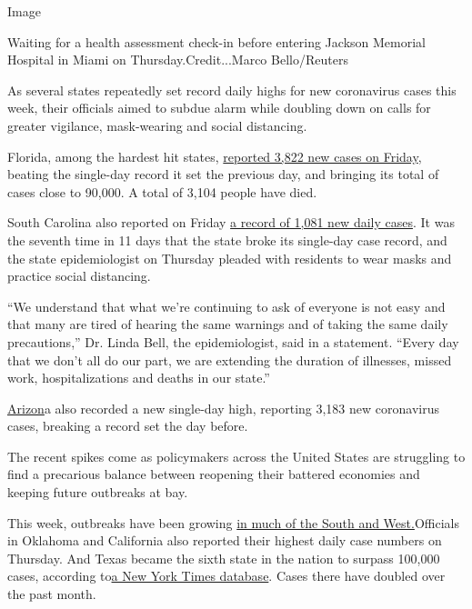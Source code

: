 Image

Waiting for a health assessment check-in before entering Jackson
Memorial Hospital in Miami on Thursday.Credit...Marco Bello/Reuters

As several states repeatedly set record daily highs for new coronavirus
cases this week, their officials aimed to subdue alarm while doubling
down on calls for greater vigilance, mask-wearing and social distancing.

Florida, among the hardest hit states,
\href{https://fdoh.maps.arcgis.com/apps/opsdashboard/index.html\#/8d0de33f260d444c852a615dc7837c86}{reported
3,822 new cases on Friday}, beating the single-day record it set the
previous day, and bringing its total of cases close to 90,000. A total
of 3,104 people have died.

South Carolina also reported on Friday
\href{https://www.scdhec.gov/infectious-diseases/viruses/coronavirus-disease-2019-covid-19/sc-testing-data-projections-covid-19}{a
record of 1,081 new daily cases}. It was the seventh time in 11 days
that the state broke its single-day case record, and the state
epidemiologist on Thursday pleaded with residents to wear masks and
practice social distancing.

``We understand that what we're continuing to ask of everyone is not
easy and that many are tired of hearing the same warnings and of taking
the same daily precautions,'' Dr. Linda Bell, the epidemiologist, said
in a statement. ``Every day that we don't all do our part, we are
extending the duration of illnesses, missed work, hospitalizations and
deaths in our state.''

\href{https://www.nytimes3xbfgragh.onion/2020/06/18/us/coronavirus-arizona-stay-at-home-mark-lamb.html}{Arizon}a
also recorded a new single-day high, reporting 3,183 new coronavirus
cases, breaking a record set the day before.

The recent spikes come as policymakers across the United States are
struggling to find a precarious balance between reopening their battered
economies and keeping future outbreaks at bay.

This week, outbreaks have been growing
\href{https://www.nytimes3xbfgragh.onion/2020/06/14/us/coronavirus-united-states.html}{in
much of the South and West.}Officials in Oklahoma and California also
reported their highest daily case numbers on Thursday. And Texas became
the sixth state in the nation to surpass 100,000 cases, according
to\href{https://www.nytimes3xbfgragh.onion/interactive/2020/us/texas-coronavirus-cases.html}{a
New York Times database}. Cases there have doubled over the past month.

